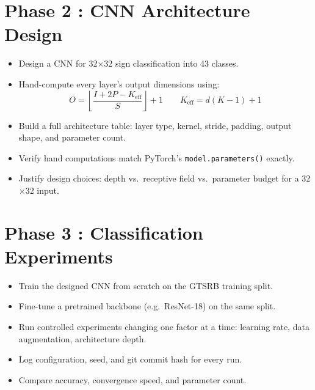 \documentclass[12pt,a4paper]{article}
\begin{document}
\section*{Phase 2 : CNN Architecture Design}

\begin{phasebox}[title={Ch.~2--3: Hand-Computed Architecture Table}]
\begin{itemize}[leftmargin=1.2em, itemsep=3pt]
  \item Design a CNN for 32$\times$32 sign classification into 43 classes.
  \item Hand-compute every layer's output dimensions using:
  \[
    O = \left\lfloor \frac{I + 2P - K_{\mathrm{eff}}}{S} \right\rfloor + 1 \qquad K_{\mathrm{eff}} = d(K-1)+1
  \]
  \item Build a full architecture table: layer type, kernel, stride, padding, output shape, and parameter count.
  \item Verify hand computations match PyTorch's \texttt{model.parameters()} exactly.
  \item Justify design choices: depth vs.\ receptive field vs.\ parameter budget for a 32$\times$32 input.
\end{itemize}
\end{phasebox}

\section*{Phase 3 : Classification Experiments}

\begin{phasebox}[title={EF2: Scratch CNN vs.\ Pretrained}]
\begin{itemize}[leftmargin=1.2em, itemsep=3pt]
  \item Train the designed CNN from scratch on the GTSRB training split.
  \item Fine-tune a pretrained backbone (e.g.\ ResNet-18) on the same split.
  \item Run controlled experiments changing one factor at a time: learning rate, data augmentation, architecture depth.
  \item Log configuration, seed, and git commit hash for every run.
  \item Compare accuracy, convergence speed, and parameter count.
\end{itemize}
\end{phasebox}
\end{document}
